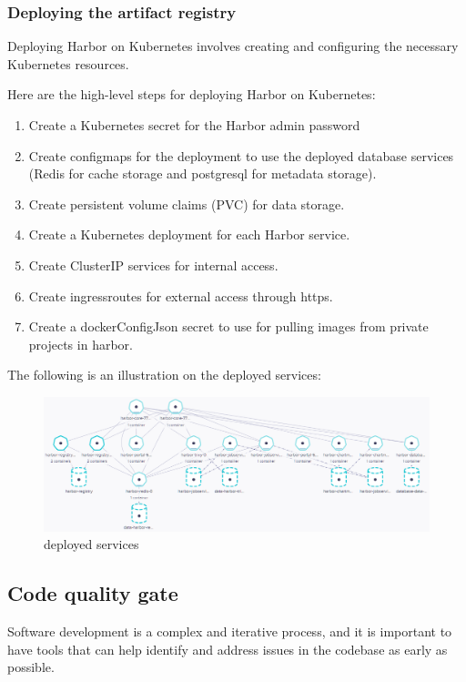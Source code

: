 \subsubsection{Deploying the artifact registry }

Deploying Harbor on Kubernetes involves creating and configuring the necessary Kubernetes resources. 

Here are the high-level steps for deploying Harbor on Kubernetes: 
\begin{enumerate}
\item Create a Kubernetes secret for the Harbor admin password 
\item Create configmaps for the deployment to use the deployed database services (Redis for cache storage and postgresql for metadata storage). 
\item Create persistent volume claims (PVC) for data storage. 
\item Create a Kubernetes deployment for each Harbor service. 
\item Create ClusterIP services for internal access. 
\item Create ingressroutes for external access through https. 
\item Create a dockerConfigJson secret to use for pulling images from private projects in harbor. 
\end{enumerate}

The following is an illustration on the deployed services: 
\begin{figure}[H]\centering
\includegraphics[width=1.0\textwidth,angle=00]{assets/f40.png}
\caption{deployed services}
\label{fig:Deployed services}
\end{figure}

\subsection{Code quality gate}

Software development is a complex and iterative process, and it is important to have tools that can help identify and address issues in the codebase as early as possible. 

